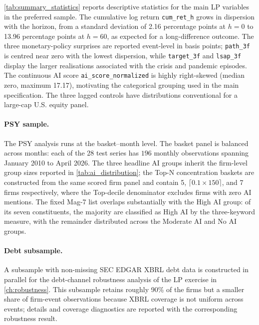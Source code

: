 \begin{table}[!htbp]
\centering
\caption{Sample-attrition funnel: from raw inputs to the LP estimation sample.}
\label{tab:attrition_full}

\end{table}

\cref{tab:summary_statistics} reports descriptive statistics for the main LP variables in the preferred sample. The cumulative log return \texttt{cum\_ret\_h} grows in dispersion with the horizon, from a standard deviation of 2.16 percentage points at $h=0$ to 13.96 percentage points at $h=60$, as expected for a long-difference outcome. The three monetary-policy surprises are reported event-level in basis points; \texttt{path\_3f} is centred near zero with the lowest dispersion, while \texttt{target\_3f} and \texttt{lsap\_3f} display the larger realisations associated with the crisis and pandemic episodes. The continuous AI score \texttt{ai\_score\_normalized} is highly right-skewed (median zero, maximum 17.17), motivating the categorical grouping used in the main specification. The three lagged controls have distributions conventional for a large-cap U.S. equity panel.

\begin{table}[!htbp]
\centering
\caption{Summary statistics for the LP estimation sample.}
\label{tab:summary_statistics}

\end{table}

\paragraph{PSY sample.} The PSY analysis runs at the basket--month level. The basket panel is balanced across months: each of the 28 test series has $196$ monthly observations spanning January 2010 to April 2026. The three headline AI groups inherit the firm-level group sizes reported in \cref{tab:ai_distribution}; the Top-N concentration baskets are constructed from the same scored firm panel and contain 5, $\lceil 0.1 \times 150 \rceil$, and 7 firms respectively, where the Top-decile denominator excludes firms with zero AI mentions. The fixed Mag-7 list overlaps substantially with the High AI group: of its seven constituents, the majority are classified as High AI by the three-keyword measure, with the remainder distributed across the Moderate AI and No AI groups.

\paragraph{Debt subsample.} A subsample with non-missing SEC EDGAR XBRL debt data is constructed in parallel for the debt-channel robustness analysis of the LP exercise in \cref{ch:robustness}. This subsample retains roughly 90\% of the firms but a smaller share of firm-event observations because XBRL coverage is not uniform across events; details and coverage diagnostics are reported with the corresponding robustness result.

